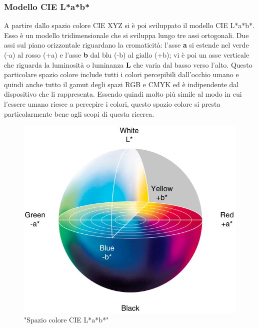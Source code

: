 \documentclass[a4paper,11pt]{article}
\begin{document}
        
    
        \newpage

        \subsubsection{Modello CIE L*a*b*}
        A partire dallo spazio colore CIE XYZ si è poi sviluppato il modello CIE L*a*b*. Esso è un modello tridimensionale che si sviluppa lungo tre assi ortogonali. Due assi sul piano orizzontale riguardano la cromaticità: l'asse \textbf{a} si estende nel verde (-a) al rosso (+a)
        e l'asse \textbf{b} dal blu (-b) al giallo (+b); vi è poi un asse verticale che riguarda la luminosità o luminanza \textbf{L} che varia dal basso verso l'alto.
        Questo particolare spazio colore include tutti i colori percepibili dall'occhio umano e quindi anche tutto il gamut degli spazi RGB e CMYK ed è indipendente dal dispositivo che li rappresenta.
        Essendo quindi molto più simile al modo in cui l'essere umano riesce a percepire i colori, questo spazio colore si presta particolarmente bene agli scopi di questa ricerca.
        \begin{figure}[h]
            \centering
            \includegraphics[scale=0.6]{CIELAB.jpg}
            \caption{"Spazio colore CIE L*a*b*"}
        \end{figure}

    \newpage
\end{document}
